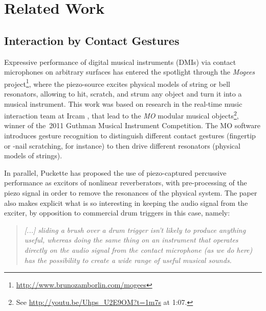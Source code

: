 \section{Related Work}\label{sec:related}

\subsection{Interaction by Contact Gestures}

\begin{sloppypar}
Expressive performance of digital musical instruments (DMIs) via contact microphones on arbitrary surfaces has entered the spotlight through the \textit{Mogees} project\footnote{\url{http://www.brunozamborlin.com/mogees}}, where the piezo-source excites physical models of string or bell resonators, allowing to hit, scratch, and strum any object and turn it into a musical instrument.  
%
This work was based on research in the real-time music interaction team at Ircam \cite{Rasamimanana11a,Bevilacqua11b}, that lead to the \textit{MO} modular musical objects\footnote{See \url{http://youtu.be/Uhps_U2E9OM?t=1m7s} at 1:07.}, winner of the~2011 Guthman Musical Instrument Competition.
The MO software introduces gesture recognition to distinguish different contact gestures (fingertip or -nail scratching, for instance) to then drive different resonators (physical models of strings).
\end{sloppypar}

In parallel, Puckette \cite{Puckette-icmc2011-infuriating-nonlinear-reverberator} has proposed the use of piezo-captured percussive performance as excitors of nonlinear reverberators, with pre-processing of the piezo signal in order to remove the resonances of the physical system. The paper also makes explicit what is so interesting in keeping the audio signal from the exciter, by opposition to commercial drum triggers in this case, namely:

\begin{quote}\textit{%
[...] sliding a brush over a drum trigger isn't likely to produce anything useful, whereas doing the same thing on an instrument that operates directly on the audio signal from the contact microphone (as we do here) has the possibility to create a wide range of useful musical sounds.}~\cite{Puckette-icmc2011-infuriating-nonlinear-reverberator}
\end{quote}

